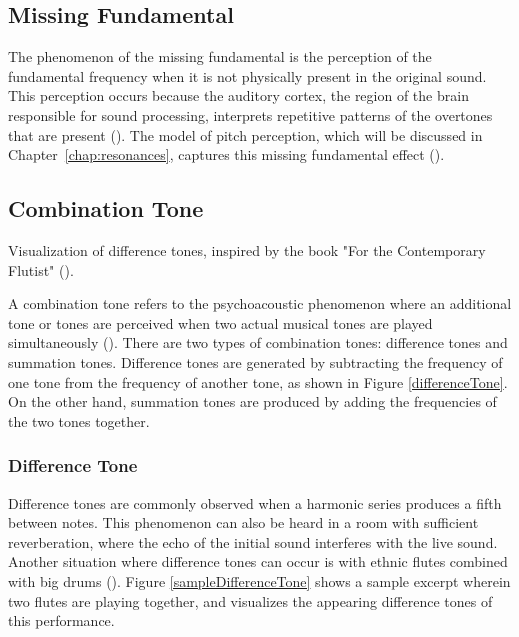 \subsection{Missing Fundamental}
The phenomenon of the missing fundamental is the perception of the fundamental frequency when it is not physically present in the original sound. This perception occurs because the auditory cortex, the region of the brain responsible for sound processing, interprets repetitive patterns of the overtones that are present (\cite{smith_human_1978, zatorre_finding_2005, schneider_structural_2005}). The model of pitch perception, which will be discussed in Chapter~\ref{chap:resonances}, captures this missing fundamental effect (\cite{homer_modelling_2023}).

\subsection{Combination Tone}

\begin{marginfigure}
\centering
\vspace{0.5cm}

\caption{Visualization of difference tones, inspired by the book "For the Contemporary Flutist" (\cite{offermans_for_nodate}).}
\label{differenceTone}  \vspace{3cm}
\end{marginfigure}


A combination tone refers to the psychoacoustic phenomenon where an additional tone or tones are perceived when two actual musical tones are played simultaneously (\cite{hosch_perception_2023}). There are two types of combination tones: difference tones and summation tones. Difference tones are generated by subtracting the frequency of one tone from the frequency of another tone, as shown in Figure \ref{differenceTone}. On the other hand, summation tones are produced by adding the frequencies of the two tones together.


\subsubsection{Difference Tone}
Difference tones are commonly observed when a harmonic series produces a fifth between notes. This phenomenon can also be heard in a room with sufficient reverberation, where the echo of the initial sound interferes with the live sound. Another situation where difference tones can occur is with ethnic flutes combined with big drums (\cite{offermans_for_nodate}). Figure \ref{sampleDifferenceTone} shows a sample excerpt wherein two flutes are playing together, and visualizes the appearing difference tones of this performance.

